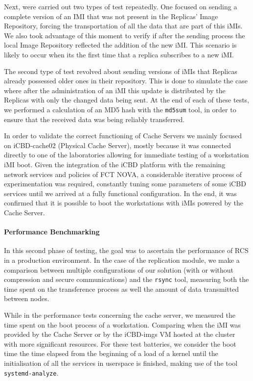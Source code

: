 Next, were carried out two types of test repeatedly. One focused on sending a complete version of an IMI that was not present in the Replicas' Image Repository, forcing the transportation of all the data that are part of this iMIs. We also took advantage of this moment to verify if after the sending process the local Image Repository reflected the addition of the new iMI. This scenario is likely to occur when its the first time that a replica subscribes to a new iMI.

The second type of test revolved about sending versions of iMIs that Replicas already possessed older ones in their repository. This is done to simulate the case where after the administration of an iMI this update is distributed by the Replicas with only the changed data being sent. At the end of each of these tests, we performed a calculation of an MD5 hash with the \texttt{md5sum} tool, in order to ensure that the received data was being reliably transferred.

In order to validate the correct functioning of Cache Servers we mainly focused on iCBD-cache02 (Physical Cache Server), mostly because it was connected directly to one of the laboratories allowing for immediate testing of a workstation iMI boot. Given the integration of the iCBD platform with the remaining network services and policies of  FCT NOVA, a considerable iterative process of experimentation was required, constantly tuning some parameters of some iCBD services until we arrived at a fully functional configuration.
In the end, it was confirmed that it is possible to boot the workstations with iMIs powered by the Cache Server.

\paragraph{Performance Benchmarking}
\label{par:eval_perf_bench}

In this second phase of testing, the goal was to ascertain the performance of RCS in a production environment. In the case of the replication module, we make a comparison between multiple configurations of our solution (with or without compression and secure communications) and the \texttt{rsync} tool, measuring both the time spent on the transference process as well the amount of data transmitted between nodes.

While in the performance tests concerning the cache server, we measured the time spent on the boot process of a workstation. Comparing when the iMI was provided by the Cache Server or by the iCBD-imgs VM hosted at the cluster with more significant resources. For these test batteries, we consider the boot time the time elapsed from the beginning of a load of a kernel until the initialisation of all the services in userspace is finished, making use of the tool \texttt{systemd-analyze}.

